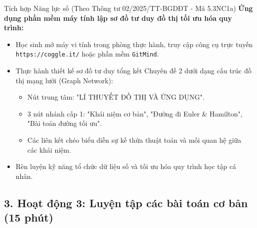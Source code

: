 \documentclass[12pt, a4paper]{article}
\begin{document}
\begin{aibox}{Tích hợp Năng lực số (Theo Thông tư 02/2025/TT-BGDĐT - Mã 5.3NC1a)}
    \textbf{Ứng dụng phần mềm máy tính lập sơ đồ tư duy đồ thị tối ưu hóa quy trình:}
    \begin{itemize}[leftmargin=0.6cm]
        \item Học sinh mở máy vi tính trong phòng thực hành, truy cập công cụ trực tuyến \texttt{https://coggle.it/} hoặc phần mềm \texttt{GitMind}.
        \item Thực hành thiết kế sơ đồ tư duy tổng kết Chuyên đề 2 dưới dạng cấu trúc đồ thị mạng lưới (Graph Network):
        \begin{itemize}
            \item Nút trung tâm: "LÍ THUYẾT ĐỒ THỊ VÀ ỨNG DỤNG".
            \item 3 nút nhánh cấp 1: "Khái niệm cơ bản", "Đường đi Euler \& Hamilton", "Bài toán đường tối ưu".
            \item Các liên kết chéo biểu diễn sự kế thừa thuật toán và mối quan hệ giữa các khái niệm.
        \end{itemize}
        \item Rèn luyện kỹ năng tổ chức dữ liệu số và tối ưu hóa quy trình học tập cá nhân.
    \end{itemize}
\end{aibox}

\subsection*{3. Hoạt động 3: Luyện tập các bài toán cơ bản (15 phút)}
\end{document}
